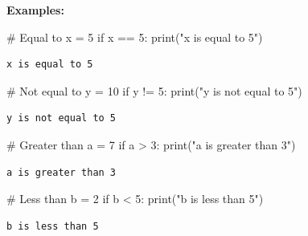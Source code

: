 \documentclass[
  letterpaper,
  DIV=11,
  numbers=noendperiod]{scrreprt}
\newenvironment{Shaded}{\begin{snugshade}}{\end{snugshade}}
\newcommand{\BuiltInTok}[1]{\textcolor[rgb]{0.00,0.23,0.31}{#1}}
\newcommand{\CommentTok}[1]{\textcolor[rgb]{0.37,0.37,0.37}{#1}}
\newcommand{\ControlFlowTok}[1]{\textcolor[rgb]{0.00,0.23,0.31}{#1}}
\newcommand{\DecValTok}[1]{\textcolor[rgb]{0.68,0.00,0.00}{#1}}
\newcommand{\NormalTok}[1]{\textcolor[rgb]{0.00,0.23,0.31}{#1}}
\newcommand{\OperatorTok}[1]{\textcolor[rgb]{0.37,0.37,0.37}{#1}}
\newcommand{\StringTok}[1]{\textcolor[rgb]{0.13,0.47,0.30}{#1}}
\begin{document}
\textbf{Examples:}

\begin{Shaded}
\begin{Highlighting}[]
\CommentTok{\# Equal to}
\NormalTok{x }\OperatorTok{=} \DecValTok{5}
\ControlFlowTok{if}\NormalTok{ x }\OperatorTok{==} \DecValTok{5}\NormalTok{:}
    \BuiltInTok{print}\NormalTok{(}\StringTok{"x is equal to 5"}\NormalTok{)}
\end{Highlighting}
\end{Shaded}

\begin{verbatim}
x is equal to 5
\end{verbatim}

\begin{Shaded}
\begin{Highlighting}[]
\CommentTok{\# Not equal to}
\NormalTok{y }\OperatorTok{=} \DecValTok{10}
\ControlFlowTok{if}\NormalTok{ y }\OperatorTok{!=} \DecValTok{5}\NormalTok{:}
    \BuiltInTok{print}\NormalTok{(}\StringTok{"y is not equal to 5"}\NormalTok{)}
\end{Highlighting}
\end{Shaded}

\begin{verbatim}
y is not equal to 5
\end{verbatim}

\begin{Shaded}
\begin{Highlighting}[]
\CommentTok{\# Greater than}
\NormalTok{a }\OperatorTok{=} \DecValTok{7}
\ControlFlowTok{if}\NormalTok{ a }\OperatorTok{\textgreater{}} \DecValTok{3}\NormalTok{:}
    \BuiltInTok{print}\NormalTok{(}\StringTok{"a is greater than 3"}\NormalTok{)}
\end{Highlighting}
\end{Shaded}

\begin{verbatim}
a is greater than 3
\end{verbatim}

\begin{Shaded}
\begin{Highlighting}[]
\CommentTok{\# Less than}
\NormalTok{b }\OperatorTok{=} \DecValTok{2}
\ControlFlowTok{if}\NormalTok{ b }\OperatorTok{\textless{}} \DecValTok{5}\NormalTok{:}
    \BuiltInTok{print}\NormalTok{(}\StringTok{"b is less than 5"}\NormalTok{)}
\end{Highlighting}
\end{Shaded}

\begin{verbatim}
b is less than 5
\end{verbatim}
\end{document}

